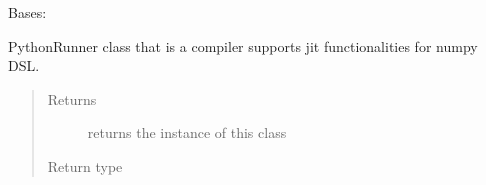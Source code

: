 \documentclass[letterpaper,10pt,english]{sphinxmanual}
\begin{document}
\begin{fulllineitems}
\label{\detokenize{cancer_frontend.python:cancer_frontend.python.python_jit_runner.PythonRunner}}
\sphinxAtStartPar
Bases: 

\sphinxAtStartPar
PythonRunner class that is a compiler supports jit functionalities for numpy DSL.
\begin{quote}\begin{description}
\item[{Returns}] \leavevmode
\sphinxAtStartPar
returns the instance of this class

\item[{Return type}] \leavevmode
\sphinxAtStartPar
{\hyperref[\detokenize{cancer_frontend.python:cancer_frontend.python.python_jit_runner.PythonRunner}]{}}

\end{description}\end{quote}

\begin{fulllineitems}
\label{\detokenize{cancer_frontend.python:cancer_frontend.python.python_jit_runner.PythonRunner.dump_mlir}}
\end{fulllineitems}


\begin{fulllineitems}
\label{\detokenize{cancer_frontend.python:cancer_frontend.python.python_jit_runner.PythonRunner.dump_python}}
\end{fulllineitems}



\end{fulllineitems}
\end{document}
